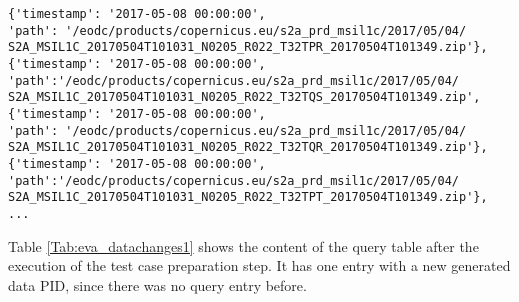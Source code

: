 \documentclass[draft,final]{vutinfth} %
\newenvironment{code}{\captionsetup{type=listing}}{}
\begin{document}
\begin{enumerate}
	\begin{code}
		\begin{verbatim}
{'timestamp': '2017-05-08 00:00:00', 
'path': '/eodc/products/copernicus.eu/s2a_prd_msil1c/2017/05/04/
S2A_MSIL1C_20170504T101031_N0205_R022_T32TPR_20170504T101349.zip'}, 
{'timestamp': '2017-05-08 00:00:00',
'path':'/eodc/products/copernicus.eu/s2a_prd_msil1c/2017/05/04/
S2A_MSIL1C_20170504T101031_N0205_R022_T32TQS_20170504T101349.zip', 
{'timestamp': '2017-05-08 00:00:00', 
'path': '/eodc/products/copernicus.eu/s2a_prd_msil1c/2017/05/04/
S2A_MSIL1C_20170504T101031_N0205_R022_T32TQR_20170504T101349.zip'}, 
{'timestamp': '2017-05-08 00:00:00',
'path':'/eodc/products/copernicus.eu/s2a_prd_msil1c/2017/05/04/
S2A_MSIL1C_20170504T101031_N0205_R022_T32TPT_20170504T101349.zip'},
...
		\end{verbatim}
		\caption{First four resulting files with creation timestamp.}
		\label{lst:eva_datachange_rf1}
	\end{code}
	
	Table \ref{Tab:eva_datachanges1} shows the content of the query table after the execution of the test case preparation step. It has one entry with a new generated data PID, since there was no query entry before.
	
	

\end{enumerate}
\end{document}
